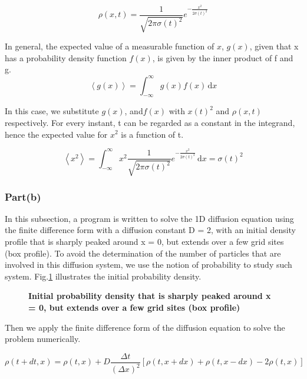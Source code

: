 \documentclass[11pt, oneside]{article}  	%
\begin{document}
\begin{equation}\label{11}
\rho(x,t)=\frac{1}{\sqrt{2\pi \sigma(t)^2}}e^{-\frac{x^2}{2\sigma(t)^2}}
\end{equation}

In general, the expected value of a measurable function of $x$, $g(x)$, given that x has a probability density function $f(x)$, is given by the inner product of f and g.
\begin{equation*}
\left \langle g(x) \right\rangle= \int_{-\infty}^{\infty} g(x)f(x)\, \mathrm{d}x
\end{equation*}

In this case, we substitute $g(x)$, and$f(x)$ with $x(t)^2$ and $\rho(x,t)$ respectively. For every instant, t can be regarded as a constant in the integrand, hence the expected value for $x^2$ is a function of t.

\begin{equation*}
\left \langle x^2 \right\rangle= \int_{-\infty}^{\infty} x^2\frac{1}{\sqrt{2\pi \sigma(t)^2}}e^{-\frac{x^2}{2\sigma(t)^2}}\, \mathrm{d}x=\sigma(t)^2
\end{equation*}

\subsubsection{Part(b)}
In this subsection, a program is written to solve the 1D diffusion equation using the finite difference form with a diffusion constant D = 2, with an initial density profile that is sharply peaked around x = 0, but extends over a few grid sites (box profile). To avoid the determination of the number of  particles that are involved in this diffusion system, we use the notion of probability to study such system. 
Fig.\ref{fig1} illustrates the initial probability density.

\begin{figure}[htbp]
\begin{center}
\caption{{\bf  Initial probability density that is sharply peaked around x = 0, but extends over a few grid sites (box profile)}}
\label{fig1}
\end{center}
\end{figure}

Then we apply the finite difference form of the diffusion equation to solve the problem numerically.

\begin{equation*}
\rho(t+dt,x)=\rho(t,x)+D\frac{\Delta t}{{(\Delta x)}^2}[\rho(t,x+dx)+\rho(t,x-dx)-2\rho(t,x)]
\end{equation*}
\end{document}
